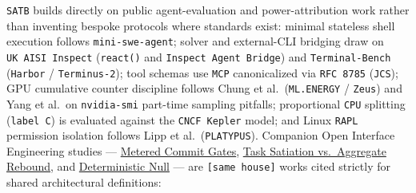 \documentclass[10pt,letterpaper]{article}
\begin{document}
\texttt{SATB} builds directly on public agent-evaluation and
power-attribution work rather than inventing bespoke protocols where
standards exist: minimal stateless shell execution follows
\texttt{mini-\allowbreak{}swe-\allowbreak{}agent}; solver and external-CLI bridging draw on
\texttt{UK\ AISI\ Inspect} (\texttt{react()} and
\texttt{Inspect\ Agent\ Bridge}) and \texttt{Terminal-\allowbreak{}Bench}
(\texttt{Harbor} / \texttt{Terminus-\allowbreak{}2}); tool schemas use \texttt{MCP}
canonicalized via \texttt{RFC\ 8785} (\texttt{JCS}); GPU cumulative
counter discipline follows Chung et al.~(\texttt{ML.ENERGY} /
\texttt{Zeus}) and Yang et al.~on \texttt{nvidia-\allowbreak{}smi} part-time sampling
pitfalls; proportional \texttt{CPU} splitting (\texttt{label\ C}) is
evaluated against the \texttt{CNCF\ Kepler} model; and Linux
\texttt{RAPL} permission isolation follows Lipp et
al.~(\texttt{PLATYPUS}). Companion Open Interface Engineering studies
--- \href{https://research.openie.dev/papers/gates/}{Metered Commit
Gates}, \href{https://research.openie.dev/papers/satiation/}{Task
Satiation vs.~Aggregate Rebound}, and
\href{https://research.openie.dev/papers/deterministic-null/}{Deterministic
Null} --- are \texttt{{[}same\ house{]}} works cited strictly for shared
architectural definitions:
\end{document}
